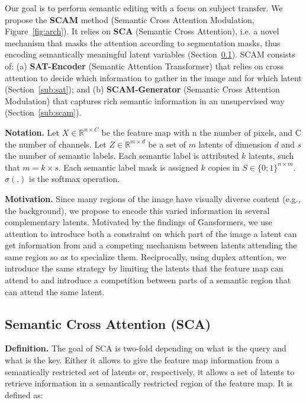 \documentclass[runningheads]{llncs}
\makeatletter
\newcommand{\eg}{e.g.\@\xspace}
\newcommand{\ie}{i.e.\@\xspace}
\newcommand{\mname}{SCAM\@\xspace}
\makeatother
\begin{document}
Our goal is to perform semantic editing with a focus on subject transfer. We propose the \textbf{\mname} method (Semantic Cross Attention Modulation, Figure~\ref{fig:arch}).   
It relies on \textbf{SCA} (Semantic Cross Attention), \ie a novel mechanism that masks the attention according to segmentation masks, thus encoding semantically meaningful latent variables (Section~\ref{sub:sca}). 
\mname consists of: 
(a)  \textbf{SAT-Encoder} (Semantic Attention Transformer) that relies on cross attention to decide which information to gather in the image and for which latent (Section~\ref{sub:sat}); and  
(b)  \textbf{SCAM-Generator} (Semantic Cross Attention Modulation) that captures rich semantic information in an unsupervised way (Section~\ref{sub:scam}).



\noindent \textbf{Notation.}
Let $X\in\mathbb{R}^{n\times C}$ be the feature map with n the number of pixels, and C the number of channels. Let $Z\in\mathbb{R}^{m\times d}$ be a set of $m$ latents of dimension $d$ and $s$ the number of semantic labels. Each semantic label is attributed $k$ latents, such that $m=k\times s$. Each semantic label mask is assigned $k$ copies in $S{\in}\{0;1\}^{n \times m}$. $\sigma(.)$ is the softmax operation.

\noindent \textbf{Motivation.} Since many regions of the image have visually diverse content (\eg, the background), we propose to encode this varied information in several complementary latents. Motivated by the findings of Gansformers\cite{hudson2021generative}, we use attention to introduce both a constraint on which part of the image a latent can get information from and a competing mechanism between latents attending the same region so as to specialize them. Reciprocally, using duplex attention, we introduce the same strategy by limiting the latents that the feature map can attend to and introduce a competition between parts of a semantic region that can attend the same latent.




\subsection{Semantic Cross Attention (SCA)}
\label{sub:sca}

\noindent \textbf{Definition.} The goal of SCA is two-fold depending on what is the query and what is the key. Either it allows to give the feature map information from a semantically restricted set of latents or, respectively, it allows a set of latents to retrieve information in a semantically restricted region of the feature map. 
It is defined as:  
\end{document}

